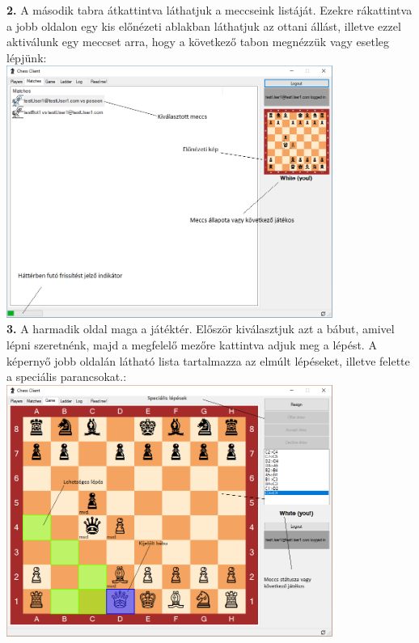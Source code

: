 \documentclass[twoside, a4paper, 12pt]{article}
\begin{document}
\noindent \textbf{2.} A második tabra átkattintva láthatjuk a meccseink listáját. Ezekre rákattintva a jobb oldalon egy kis előnézeti ablakban láthatjuk az ottani állást, illetve ezzel aktiválunk egy meccset arra, hogy a következő tabon megnézzük vagy esetleg lépjünk: \\
\includegraphics[width=0.8\textwidth]{img/chessClient_2.png} \\

\noindent \textbf{3.} A harmadik oldal maga a játéktér. Először kiválasztjuk azt a bábut, amivel lépni szeretnénk, majd a megfelelő mezőre kattintva adjuk meg a lépést. A képernyő jobb oldalán látható lista tartalmazza az elmúlt lépéseket, illetve felette a speciális parancsokat.: \\
\includegraphics[width=0.8\textwidth]{img/chessClient_3.png} \\
\end{document}
